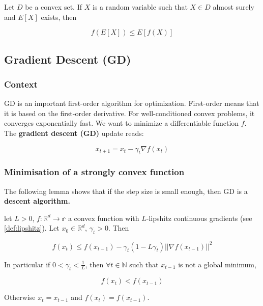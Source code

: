 \documentclass[
10pt, %
a4paper, %
oneside, %
headinclude,footinclude, %
BCOR5mm, %
]{scrartcl}
\begin{document}
Let $D$ be a convex set. If $X$ is a random variable such that $ X\in D$ almost surely and $ E[X]$ exists, then

\begin{equation*}
    f(E[X])\leq E[f(X)]
\end{equation*}

\subsection{\large\color{MidnightBlue}Gradient Descent (GD)}

\subsubsection{\large\color{Periwinkle}Context}

GD is an important first-order algorithm for optimization. First-order means that it is based on the first-order derivative. For well-conditioned convex problems, it converges exponentially fast. We want to minimize a differentiable function $f$. The \textbf{{gradient descent (GD)}}  update reads:

\begin{equation*}
    x_{t+1} = x_t - \gamma_t \nabla f(x_t)
\end{equation*}

\subsubsection{\large\color{Periwinkle}Minimisation of a strongly convex function}

The following lemma shows that if the step size is small enough, then GD is a \textbf{{descent algorithm.}} 

\begin{lemma}
    let $L>0$, $f: \mathbb{R}^d\rightarrow \mathbb{r} $ a convex function with $L$-lipshitz continuous gradients (see \ref{def:lipshitz}). Let $x_0\in \mathbb{R}^d$, $\gamma_t >0$. Then

    \begin{equation*}
	f(x_t)\leq f(x_{t-1})-\gamma_t (1-L\gamma_t) ||\nabla f(x_{t-1})||^2
    \end{equation*}

    In particular if $0<  \gamma_t < \frac{1}{L} $, then $ \forall t\in \mathbb{N} $ such that $ x_{t-1}$ is not a global minimum,

    \begin{equation*}
	f(x_t)<f(x_{t-1})
    \end{equation*}

    Otherwise $x_t = x_{t-1}$ and $f(x_t) = f(x_{t-1})$.
\end{lemma}
\end{document}
